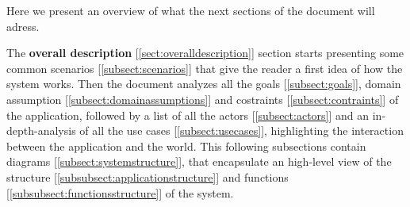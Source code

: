 Here we present an overview of what the next sections of the document will adress.

The \textbf{overall description} [\ref{sect:overalldescription}] section starts presenting some common scenarios [\ref{subsect:scenarios}] that give the reader a first idea of how the system works. Then the document analyzes all the goals [\ref{subsect:goals}], domain assumption [\ref{subsect:domainassumptions}] and costraints [\ref{subsect:contraints}] of the application, followed by a list of all the actors [\ref{subsect:actors}] and an in-depth-analysis of all the use cases [\ref{subsect:usecases}], highlighting the interaction between the application and the world. This following subsections contain diagrams [\ref{subsect:systemstructure}], that encapsulate an high-level view of the structure [\ref{subsubsect:applicationstructure}] and functions [\ref{subsubsect:functionsstructure}] of the system.

